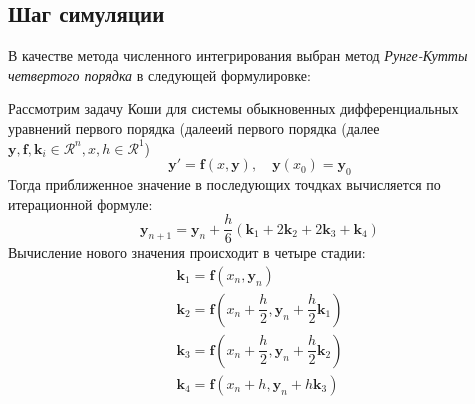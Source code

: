 \documentclass{article}%
\numberwithin{equation}{subsection}
\let\oldsubsection\subsection%
\renewcommand{\subsection}{%
  \renewcommand{\theequation}{\thesubsection.\arabic{equation}}%
  \oldsubsection}%
\begin{document}
\subsection{Шаг симуляции}
В качестве метода численного интегрирования выбран метод {\it Рунге-Кутты четвертого порядка} в следующей формулировке:
\newline\par
Рассмотрим задачу Коши для системы обыкновенных дифференциальных уравнений первого порядка (далееий первого порядка (далее $\mathbf{y}, \mathbf{f}, \mathbf{k}_i \in \mathcal{R}^n, x, h \in \mathcal{R}^1$)
\begin{equation}
    \mathbf{y}'=\mathbf{f}(x, \mathbf{y}), \quad \mathbf{y}(x_0)=\mathbf{y}_0
\end{equation}
Тогда приближенное значение в последующих точдках вычисляется по итерационной формуле:
\begin{equation}
    \mathbf{y}_{n+1}=\mathbf{y}_n + \dfrac{h}{6}(\mathbf{k}_1 + 2\mathbf{k}_2 + 2\mathbf{k}_3 + \mathbf{k}_4)
\end{equation}
Вычисление нового значения происходит в четыре стадии:
\begin{equation}
\begin{gathered}
    \mathbf{k}_1 = \mathbf{f}(x_n, \mathbf{y}_n)\\
    \mathbf{k}_2 = \mathbf{f}(x_n + \dfrac{h}{2}, \mathbf{y}_n + \dfrac{h}{2}\mathbf{k}_1)\\
    \mathbf{k}_3 = \mathbf{f}(x_n + \dfrac{h}{2}, \mathbf{y}_n + \dfrac{h}{2}\mathbf{k}_2)\\
    \mathbf{k}_4 = \mathbf{f}(x_n + h, \mathbf{y}_n + h\mathbf{k}_3)
\end{gathered}
\end{equation}

\end{document}
